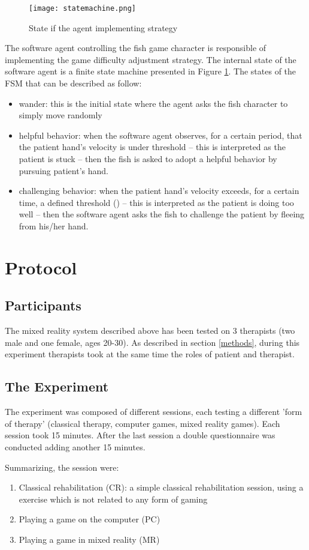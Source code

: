 \documentclass[preprint,authoryear,12pt]{elsarticle}
\begin{document}
\begin{figure}[h]
	\centering
		\texttt{[image: statemachine.png]}
	\caption{State if the agent implementing strategy}
	\label{fig:statemachine}
\end{figure}

The software agent controlling the fish game character is responsible of implementing the game difficulty adjustment strategy.
The internal state of the software agent is a finite state machine presented in Figure \ref{fig:statemachine}. The states of the FSM that can be described as follow:
\begin{itemize}
\item wander: this is the initial state where the agent asks the fish character to simply move randomly
\item helpful behavior: when the software agent observes, for a certain period, that the patient hand's velocity is under  threshold -- this is interpreted as the patient is stuck -- then the fish is asked to adopt a helpful behavior by pursuing patient's hand.
\item challenging behavior: when the patient hand's velocity exceeds, for a certain time, a defined threshold () -- this is interpreted as the patient is doing too well -- then the software agent asks the fish to challenge the patient by fleeing from his/her hand.
\end{itemize}



\section{Protocol}
\label{protocol}
\subsection{Participants}
The mixed reality system described above has been tested on 3 therapists (two male and one female, ages 20-30). As described in section \ref{methods}, during  this experiment therapists  took at the same time the roles of patient and  therapist.
\par \medskip

\subsection{The Experiment}
The experiment was composed of different sessions, each testing a different 'form of therapy' (classical therapy, computer games, mixed reality games). Each session took 15 minutes. After the last session a double questionnaire was conducted adding another 15 minutes. \par \medskip
Summarizing, the session were:
\begin{enumerate}
\item Classical rehabilitation (CR): a simple classical rehabilitation session, using a exercise which is not related to any form of gaming
\item	 Playing a game on the computer (PC)
\item	 Playing a game in mixed reality (MR)
\end{enumerate}
\end{document}
